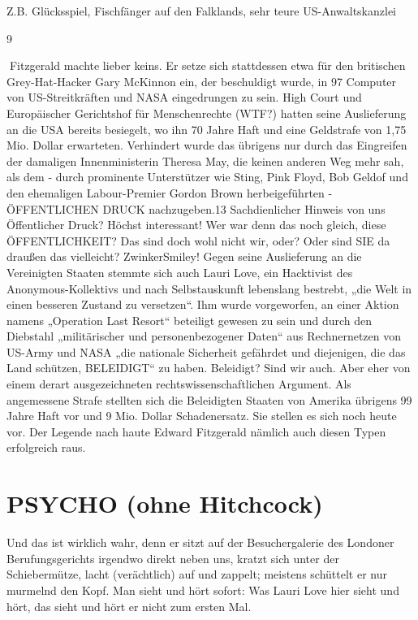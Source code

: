 \begin{multicols}{2}
Z.B. Glücksspiel, Fischfänger auf den Falklands, sehr teure US-Anwaltskanzlei

9

Fitzgerald machte lieber keins. Er setze sich stattdessen
etwa für den britischen Grey-Hat-Hacker Gary McKinnon ein, der beschuldigt wurde, in 97 Computer von
US-Streitkräften und NASA eingedrungen zu sein. High
Court und Europäischer Gerichtshof für Menschenrechte (WTF?) hatten seine Auslieferung an die USA bereits
besiegelt, wo ihn 70 Jahre Haft und eine Geldstrafe von
1,75 Mio. Dollar erwarteten. Verhindert wurde das übrigens nur durch das Eingreifen der damaligen Innenministerin Theresa May, die keinen anderen Weg mehr sah,
als dem - durch prominente Unterstützer wie Sting, Pink
Floyd, Bob Geldof und den ehemaligen Labour-Premier Gordon Brown herbeigeführten - ÖFFENTLICHEN
DRUCK nachzugeben.13
Sachdienlicher Hinweis von uns
Öffentlicher Druck? Höchst interessant! Wer war denn
das noch gleich, diese ÖFFENTLICHKEIT? Das sind doch
wohl nicht wir, oder? Oder sind SIE da draußen das vielleicht? ZwinkerSmiley!
Gegen seine Auslieferung an die Vereinigten Staaten
stemmte sich auch Lauri Love, ein Hacktivist des Anonymous-Kollektivs und nach Selbstauskunft lebenslang
bestrebt, „die Welt in einen besseren Zustand zu versetzen“. Ihm wurde vorgeworfen, an einer Aktion namens
„Operation Last Resort“ beteiligt gewesen zu sein und
durch den Diebstahl „militärischer und personenbezogener Daten“ aus Rechnernetzen von US-Army und
NASA „die nationale Sicherheit gefährdet und diejenigen, die das Land schützen, BELEIDIGT“ zu haben. Beleidigt? Sind wir auch. Aber eher von einem derart ausgezeichneten rechtswissenschaftlichen Argument. Als
angemessene Strafe stellten sich die Beleidigten Staaten
von Amerika übrigens 99 Jahre Haft vor und 9 Mio. Dollar Schadenersatz.
Sie stellen es sich noch heute vor. Der Legende nach
haute Edward Fitzgerald nämlich auch diesen Typen erfolgreich raus.



\chapter{PSYCHO (ohne Hitchcock)}
Und das ist wirklich wahr, denn er sitzt auf der Besuchergalerie des Londoner Berufungsgerichts irgendwo
direkt neben uns, kratzt sich unter der Schiebermütze,
lacht (verächtlich) auf und zappelt; meistens schüttelt
er nur murmelnd den Kopf. Man sieht und hört sofort:
Was Lauri Love hier sieht und hört, das sieht und hört er
nicht zum ersten Mal.


\end{multicols}
